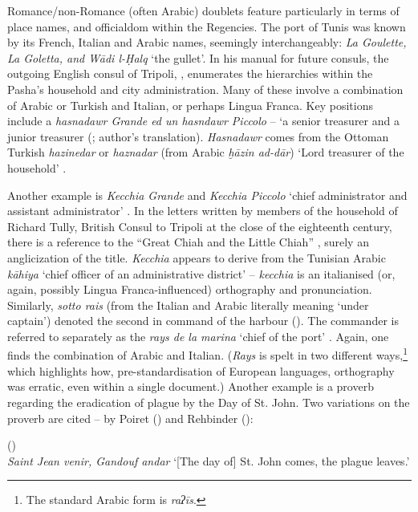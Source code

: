 \documentclass[output=paper]{langsci/langscibook}
\begin{document}
	Romance/non-Romance (often Arabic) doublets feature particularly in terms of place names, and officialdom within the Regencies. The port of Tunis was known by its French, Italian and Arabic names, seemingly interchangeably: \textit{La Goulette, La Goletta, and Wādi l-Ḥalq} ‘the gullet’. In his manual for future consuls, the outgoing English consul of Tripoli, , enumerates the hierarchies within the Pasha’s household and city administration. Many of these involve a combination of Arabic or Turkish and Italian, or perhaps Lingua Franca. Key positions include a \textit{hasnadawr Grande ed un hasndawr Piccolo} – ‘a senior treasurer and a junior treasurer (\citealt[97]{Pennell1982}; author's translation).  \textit{Hasnadawr} comes from the Ottoman Turkish \textit{hazinedar} or \textit{haznadar} (from Arabic \textit{ḫāzin ad-dār}) ‘Lord treasurer of the household’ \citep{Gilson1987}.
	
	Another example is \textit{Kecchia Grande} and \textit{Kecchia Piccolo} ‘chief administrator and assistant administrator’ \citep[104]{Pennell1982}. In the letters written by members of the household of Richard Tully, British Consul to Tripoli at the close of the eighteenth century, there is a reference to the ``Great Chiah and the Little Chiah'' \citep[70]{Tully1819}, surely an anglicization of the title. \textit{Kecchia} appears to derive from the Tunisian Arabic \textit{kāhiya} ‘chief officer of an administrative district’ – \textit{kecchia} is an italianised (or, again, possibly Lingua Franca-influenced) orthography and pronunciation. Similarly, \textit{sotto rais} (from the Italian and Arabic literally meaning ‘under captain’) denoted the second in command of the harbour (\citealt[97, 100]{Pennell1982}). The commander is referred to separately as the \textit{rays de la marina} ‘chief of the port’ \citep[92]{Pennell1982}. Again, one finds the combination of Arabic and Italian. (\textit{Rays} is spelt in two different ways,\footnote{The standard Arabic form is \textit{raʔīs}.} which highlights how, pre-standardisation of European languages, orthography was erratic, even within a single document.) Another example is a proverb regarding the eradication of plague by the Day of St. John. Two variations on the proverb are cited – by Poiret (\citeyear{Poiret1802}) and Rehbinder (\citeyear{Rehbinder1800}): 
	
	\ea
	(\citealt{Poiret1802})\\
	\textit{Saint Jean venir, Gandouf andar} 
	\glt ‘[The day of] St. John comes, the plague leaves.’
	\z
	
\end{document}

